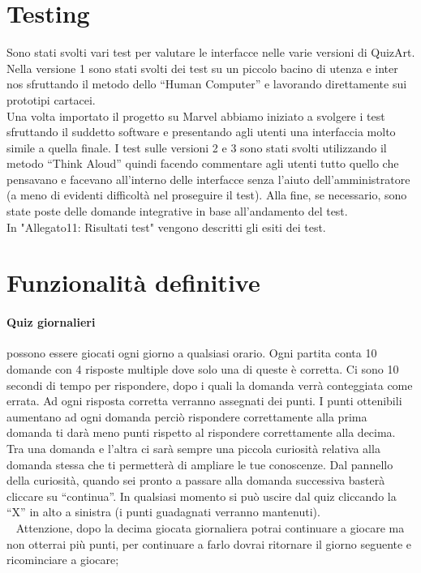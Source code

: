\documentclass{article}
\begin{document}
\section{Testing}
Sono stati svolti vari test per valutare le interfacce nelle varie versioni di QuizArt. Nella versione 1 sono stati svolti dei test su un piccolo bacino di utenza e inter nos sfruttando il metodo dello “Human Computer” e lavorando direttamente sui prototipi cartacei.
\\\indent
Una volta importato il progetto su Marvel abbiamo iniziato a svolgere i test sfruttando il suddetto software e presentando agli utenti una interfaccia molto simile a quella finale. I test sulle versioni 2 e 3 sono stati svolti utilizzando il metodo “Think Aloud” quindi facendo commentare agli utenti tutto quello che pensavano e facevano all’interno delle interfacce senza l’aiuto dell’amministratore (a meno di evidenti difficoltà nel proseguire il test). Alla fine, se necessario, sono state poste delle domande integrative in base all’andamento del test.
\\\indent
In "Allegato11: Risultati test"\cite{Allegato11} vengono descritti gli esiti dei test.

\section{Funzionalità definitive}

\paragraph{Quiz giornalieri} possono essere giocati ogni giorno a qualsiasi orario. Ogni partita conta 10 domande con 4 risposte multiple dove solo una di queste è corretta. Ci sono 10 secondi di tempo per rispondere, dopo i quali la domanda verrà conteggiata come errata. Ad ogni risposta corretta verranno assegnati dei punti. I punti ottenibili aumentano ad ogni domanda perciò rispondere correttamente alla prima domanda ti darà meno punti rispetto al rispondere correttamente alla decima. Tra una domanda e l’altra ci sarà sempre una piccola curiosità relativa alla domanda stessa che ti permetterà di ampliare le tue conoscenze. Dal pannello della curiosità, quando sei pronto a passare alla domanda successiva basterà cliccare su “continua”. In qualsiasi momento si può uscire dal quiz cliccando la “X” in alto a sinistra (i punti guadagnati verranno mantenuti).
\\ 
Attenzione, dopo la decima giocata giornaliera potrai continuare a giocare ma non otterrai più punti, per continuare a farlo dovrai ritornare il giorno seguente e ricominciare a giocare;
\end{document}
